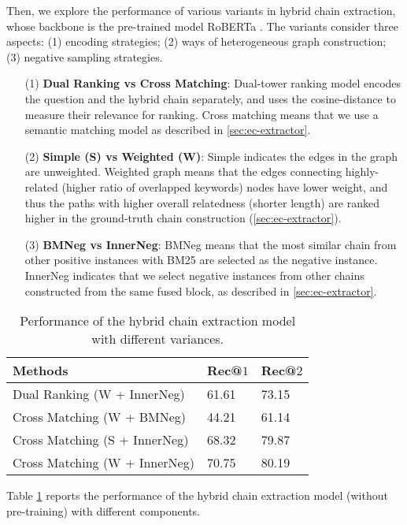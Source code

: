 \documentclass[11pt]{article}
\begin{document}
Then, we explore the performance of various variants in hybrid chain extraction, whose backbone is the pre-trained model RoBERTa \cite{Liu2019RoBERTaAR}.
The variants consider three aspects: (1) encoding strategies; (2) ways of heterogeneous graph construction; (3) negative sampling strategies.
	\begin{itemize}
		\item[(1)] \textbf{Dual Ranking vs Cross Matching}: Dual-tower ranking model \cite{karpukhin2020dense} encodes the question and the hybrid chain separately, and uses the cosine-distance to measure their relevance for ranking. Cross matching means that we use a semantic matching model as described in \cref{sec:ec-extractor}.
\item[(2)] \textbf{Simple (S) vs Weighted (W)}: Simple indicates the edges in the graph are unweighted. Weighted graph means that the edges connecting highly-related (higher ratio of overlapped keywords) nodes have lower weight, and thus the paths with higher overall relatedness (shorter length) are ranked higher in the ground-truth chain construction (\cref{sec:ec-extractor}). 
		\item[(3)] \textbf{BMNeg vs InnerNeg}: BMNeg means that the most similar chain from other positive instances with BM25 are selected as the negative instance.
		InnerNeg indicates that we select negative instances from other chains constructed from the same fused block, as described in \cref{sec:ec-extractor}.
	\end{itemize}
	\begin{table}[h]
	\small
		\centering
		\begin{tabular}{lll}
			\hline
			Methods                               & Rec@$1$ & Rec@$2$ \\ \hline
			Dual Ranking (W + InnerNeg)  & 61.61      &  73.15          \\
			Cross Matching (W + BMNeg)    & 44.21      & 61.14      \\
			Cross Matching (S + InnerNeg)   & 68.32      & 79.87      \\
			Cross Matching (W + InnerNeg) & 70.75      & 80.19      \\ \hline
		\end{tabular}
		\caption{Performance of the hybrid chain extraction model with different variances.}
\label{tab:ec-extraction}
	\end{table}
	Table \ref{tab:ec-extraction} reports the performance of the hybrid chain extraction model (without pre-training) with different components. 
\end{document}
